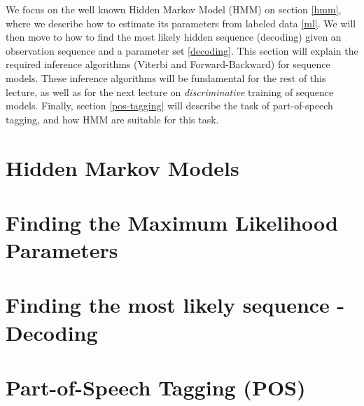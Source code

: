 We focus on the well known Hidden Markov Model (HMM) on section
\ref{hmm}, where we describe how to estimate its parameters from labeled data
\ref{ml}. We will then move to how to find the most likely hidden sequence
(decoding) given an observation sequence and a parameter set
\ref{decoding}. This section will explain the required inference
algorithms (Viterbi and Forward-Backward) for sequence models. These
inference algorithms will be fundamental for the rest of this lecture,
as well as for the next lecture on \emph{discriminative} training of sequence
models. Finally, section \ref{pos-tagging} will describe the task of 
part-of-speech tagging, and how HMM are suitable for this task.






\section{\label{hmm} Hidden Markov Models}






\section{\label{ml} Finding the Maximum Likelihood Parameters}




\section{\label{decoding} Finding the most likely sequence - Decoding}


\section{\label{pos-tagging} Part-of-Speech Tagging (POS)}



%

%


